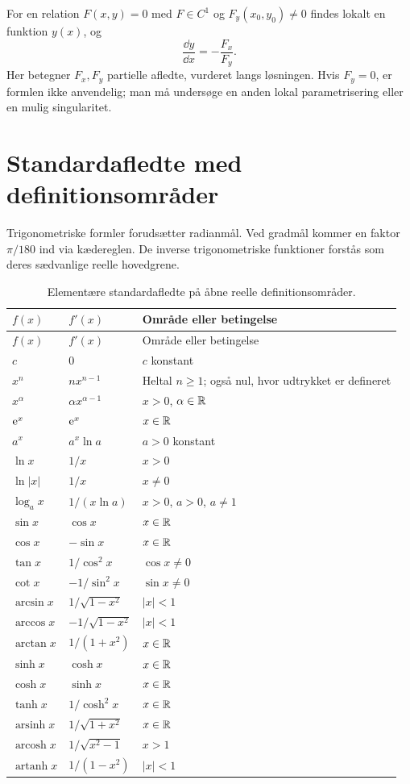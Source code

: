 For en relation $F(x,y)=0$ med $F\in C^1$ og $F_y(x_0,y_0)\ne0$ findes lokalt en funktion $y(x)$, og
\[
 \frac{\dd y}{\dd x}=-\frac{F_x}{F_y}.
\]
Her betegner $F_x,F_y$ partielle afledte, vurderet langs løsningen. Hvis $F_y=0$, er formlen ikke anvendelig; man må undersøge en anden lokal parametrisering eller en mulig singularitet.

\section{Standardafledte med definitionsområder}
\label{sec:standard}
Trigonometriske formler forudsætter radianmål. Ved gradmål kommer en faktor $\pi/180$ ind via kædereglen. De inverse trigonometriske funktioner forstås som deres sædvanlige reelle hovedgrene.

\begin{longtable}{@{}p{}p{}p{}@{}}
\caption{Elementære standardafledte på åbne reelle definitionsområder.}\\
\toprule $f(x)$ & $f'(x)$ & Område eller betingelse\\\midrule\endfirsthead
\toprule $f(x)$ & $f'(x)$ & Område eller betingelse\\\midrule\endhead
$c$ & $0$ & $c$ konstant\\[1mm]
$x^n$ & $nx^{n-1}$ & Heltal $n\ge1$; også nul, hvor udtrykket er defineret\\[1mm]
$x^\alpha$ & $\alpha x^{\alpha-1}$ & $x>0$, $\alpha\in\mathbb{R}$\\[1mm]
$\mathrm{e}^x$ & $\mathrm{e}^x$ & $x\in\mathbb{R}$\\[1mm]
$a^x$ & $a^x\ln a$ & $a>0$ konstant\\[1mm]
$\ln x$ & $1/x$ & $x>0$\\[1mm]
$\ln|x|$ & $1/x$ & $x\ne0$\\[1mm]
$\log_a x$ & $1/(x\ln a)$ & $x>0$, $a>0$, $a\ne1$\\[1mm]
$\sin x$ & $\cos x$ & $x\in\mathbb{R}$\\[1mm]
$\cos x$ & $-\sin x$ & $x\in\mathbb{R}$\\[1mm]
$\tan x$ & $1/\cos^2 x$ & $\cos x\ne0$\\[1mm]
$\cot x$ & $-1/\sin^2 x$ & $\sin x\ne0$\\[1mm]
$\arcsin x$ & $1/\sqrt{1-x^2}$ & $|x|<1$\\[1mm]
$\arccos x$ & $-1/\sqrt{1-x^2}$ & $|x|<1$\\[1mm]
$\arctan x$ & $1/(1+x^2)$ & $x\in\mathbb{R}$\\[1mm]
$\sinh x$ & $\cosh x$ & $x\in\mathbb{R}$\\[1mm]
$\cosh x$ & $\sinh x$ & $x\in\mathbb{R}$\\[1mm]
$\tanh x$ & $1/\cosh^2 x$ & $x\in\mathbb{R}$\\[1mm]
$\operatorname{arsinh}x$ & $1/\sqrt{1+x^2}$ & $x\in\mathbb{R}$\\[1mm]
$\operatorname{arcosh}x$ & $1/\sqrt{x^2-1}$ & $x>1$\\[1mm]
$\operatorname{artanh}x$ & $1/(1-x^2)$ & $|x|<1$\\
\bottomrule
\end{longtable}
